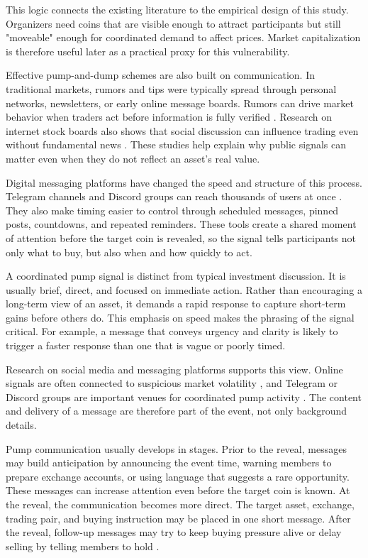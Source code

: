 This logic connects the existing literature to the empirical design of this study. Organizers need coins that are visible enough to attract participants but still "moveable" enough for coordinated demand to affect prices. Market capitalization is therefore useful later as a practical proxy for this vulnerability.

Effective pump-and-dump schemes are also built on communication. In traditional markets, rumors and tips were typically spread through personal networks, newsletters, or early online message boards. Rumors can drive market behavior when traders act before information is fully verified \cite{vanbommel2003rumors}. Research on internet stock boards also shows that social discussion can influence trading even without fundamental news \cite{sabherwal2011internet}. These studies help explain why public signals can matter even when they do not reflect an asset's real value.

Digital messaging platforms have changed the speed and structure of this process. Telegram channels and Discord groups can reach thousands of users at once \cite{hamrick2021examination, lamorgia2023doge}. They also make timing easier to control through scheduled messages, pinned posts, countdowns, and repeated reminders. These tools create a shared moment of attention before the target coin is revealed, so the signal tells participants not only what to buy, but also when and how quickly to act.

A coordinated pump signal is distinct from typical investment discussion. It is usually brief, direct, and focused on immediate action. Rather than encouraging a long-term view of an asset, it demands a rapid response to capture short-term gains before others do. This emphasis on speed makes the phrasing of the signal critical. For example, a message that conveys urgency and clarity is likely to trigger a faster response than one that is vague or poorly timed.

Research on social media and messaging platforms supports this view. Online signals are often connected to suspicious market volatility \cite{mirtaheri2021identifying, xu2019anatomy}, and Telegram or Discord groups are important venues for coordinated pump activity \cite{hamrick2021examination, lamorgia2023doge}. The content and delivery of a message are therefore part of the event, not only background details.

Pump communication usually develops in stages. Prior to the reveal, messages may build anticipation by announcing the event time, warning members to prepare exchange accounts, or using language that suggests a rare opportunity. These messages can increase attention even before the target coin is known. At the reveal, the communication becomes more direct. The target asset, exchange, trading pair, and buying instruction may be placed in one short message. After the reveal, follow-up messages may try to keep buying pressure alive or delay selling by telling members to hold \cite{xu2019anatomy, lamorgia2023doge}.


